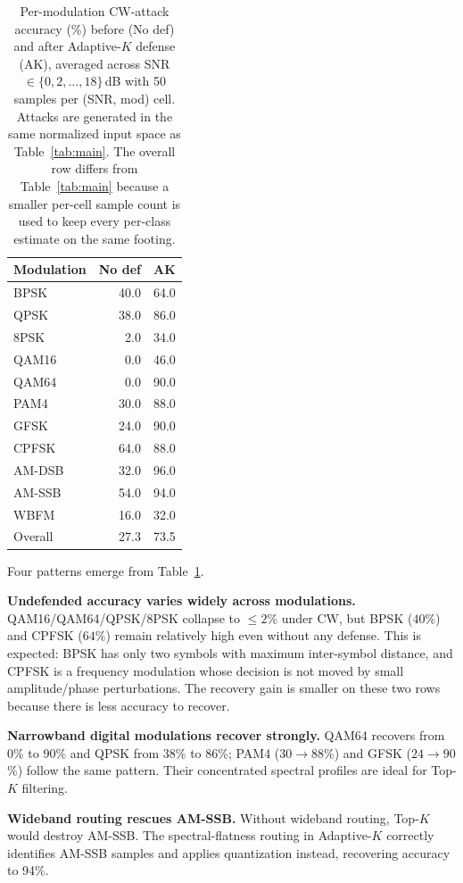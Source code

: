 \begin{table}[!ht]
\caption{Per-modulation CW-attack accuracy (\%) before (No def) and
  after Adaptive-$K$ defense (AK), averaged across SNR
  $\in \{0, 2, \ldots, 18\}$\,dB with 50 samples per (SNR, mod) cell.
  Attacks are generated in the same normalized input space as
  Table~\ref{tab:main}. The overall row differs from
  Table~\ref{tab:main} because a smaller per-cell sample count is used
  to keep every per-class estimate on the same footing.}
\label{tab:per_mod}
\centering
\small
\begin{tabular}{lrr}
\toprule
Modulation & No def & AK \\
\midrule
BPSK       &  40.0 & 64.0 \\
QPSK       &  38.0 & 86.0 \\
8PSK       &   2.0 & 34.0 \\
QAM16      &   0.0 & 46.0 \\
QAM64      &   0.0 & 90.0 \\
PAM4       &  30.0 & 88.0 \\
GFSK       &  24.0 & 90.0 \\
CPFSK      &  64.0 & 88.0 \\
AM-DSB     &  32.0 & 96.0 \\
AM-SSB     &  54.0 & 94.0 \\
WBFM       &  16.0 & 32.0 \\
\midrule
Overall    &  27.3 & 73.5 \\
\bottomrule
\end{tabular}
\end{table}

Four patterns emerge from Table~\ref{tab:per_mod}.

\textbf{Undefended accuracy varies widely across modulations.}
QAM16/QAM64/QPSK/8PSK collapse to $\leq 2\%$ under CW, but
BPSK ($40\%$) and CPFSK ($64\%$) remain relatively high even
without any defense. This is expected: BPSK has only two symbols
with maximum inter-symbol distance, and CPFSK is a frequency
modulation whose decision is not moved by small amplitude/phase
perturbations. The recovery gain is smaller on these two rows
because there is less accuracy to recover.

\textbf{Narrowband digital modulations recover strongly.}
QAM64 recovers from 0\% to 90\% and QPSK from 38\% to 86\%; PAM4
($30\to88$\%) and GFSK ($24\to90$\%) follow the same pattern. Their
concentrated spectral profiles are ideal for Top-$K$ filtering.

\textbf{Wideband routing rescues AM-SSB.}
Without wideband routing, Top-$K$ would destroy AM-SSB. The
spectral-flatness routing in Adaptive-$K$ correctly identifies
AM-SSB samples and applies quantization instead, recovering accuracy
to 94\%.

